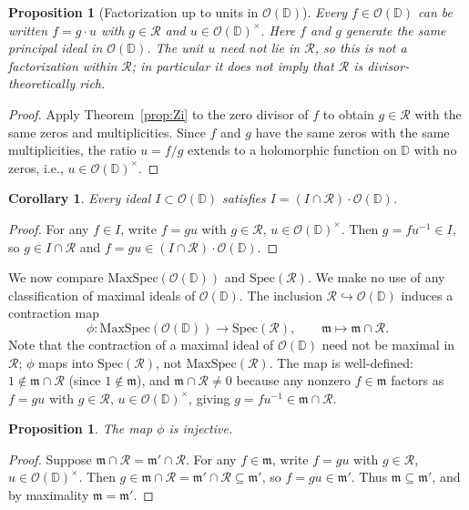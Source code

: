 \documentclass[12pt]{amsart}
\newtheorem{corollary}[theorem]{Corollary}
\newtheorem{proposition}[theorem]{Proposition}
\theoremstyle{definition}
\newcommand{\D}{\mathbb{D}}
\newcommand{\OD}{\mathcal{O}(\D)}
\newcommand{\mR}{\mathcal{R}}
\begin{document}
\begin{proposition}[Factorization up to units in $\OD$]
\label{prop:associate}
Every $f \in \OD$ can be written $f = g \cdot u$ with $g \in \mR$ and
$u \in \OD^\times$.  Here $f$ and $g$ generate the same principal ideal
in $\OD$.  The unit $u$ need not lie in $\mR$, so this is not a
factorization within $\mR$; in particular it does not imply that $\mR$
is divisor-theoretically rich.
\end{proposition}

\begin{proof}
Apply Theorem~\ref{prop:Zi} to the zero divisor of $f$ to obtain
$g \in \mR$ with the same zeros and multiplicities.  Since $f$ and $g$
have the same zeros with the same multiplicities, the ratio $u = f/g$
extends to a holomorphic function on $\D$ with no zeros, i.e.,
$u \in \OD^\times$.
\end{proof}

\begin{corollary}
\label{cor:ideals}
Every ideal $I \subset \OD$ satisfies $I = (I \cap \mR)\cdot\OD$.
\end{corollary}

\begin{proof}
For any $f \in I$, write $f = gu$ with $g \in \mR$, $u \in \OD^\times$.
Then $g = fu^{-1} \in I$, so $g \in I \cap \mR$ and
$f = gu \in (I \cap \mR)\cdot\OD$.
\end{proof}

We now compare $\mathrm{MaxSpec}(\OD)$ and $\mathrm{Spec}(\mR)$.  We
make no use of any classification of maximal ideals of $\OD$.  The
inclusion $\mR \hookrightarrow \OD$ induces a contraction map
\[
  \phi \colon \mathrm{MaxSpec}(\OD) \to \mathrm{Spec}(\mR),
  \qquad \mathfrak{m} \mapsto \mathfrak{m} \cap \mR.
\]
Note that the contraction of a maximal ideal of $\OD$ need not be
maximal in $\mR$; $\phi$ maps into $\mathrm{Spec}(\mR)$, not
$\mathrm{MaxSpec}(\mR)$.  The map is well-defined: $1 \notin \mathfrak{m}
\cap \mR$ (since $1 \notin \mathfrak{m}$), and $\mathfrak{m} \cap \mR
\neq 0$ because any nonzero $f \in \mathfrak{m}$ factors as $f = gu$
with $g \in \mR$, $u \in \OD^\times$, giving $g = fu^{-1} \in
\mathfrak{m} \cap \mR$.

\begin{proposition}
\label{prop:inject}
The map $\phi$ is injective.
\end{proposition}

\begin{proof}
Suppose $\mathfrak{m} \cap \mR = \mathfrak{m}' \cap \mR$.  For any
$f \in \mathfrak{m}$, write $f = gu$ with $g \in \mR$,
$u \in \OD^\times$.  Then $g \in \mathfrak{m} \cap \mR =
\mathfrak{m}' \cap \mR \subseteq \mathfrak{m}'$, so $f = gu \in
\mathfrak{m}'$.  Thus $\mathfrak{m} \subseteq \mathfrak{m}'$, and by
maximality $\mathfrak{m} = \mathfrak{m}'$.
\end{proof}
\end{document}

